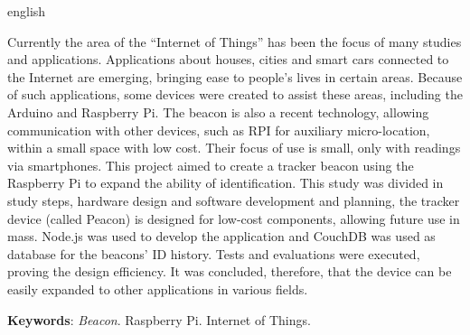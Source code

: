\documentclass[
		12pt,				%
		openright,			%
		oneside,			%
		a4paper,			%
		chapter=TITLE,		%
		english,			%
		brazil				%
	]{abntex2}
\newif\iffinal
\begin{document}
	\begin{resumo}[Abstract]
	 	\begin{otherlanguage*}{english}
			
			Currently the area of ​​the “Internet of Things” has been the focus of many studies and applications. Applications about houses, cities and smart cars connected to the Internet are emerging, bringing ease to people’s lives in certain areas. Because of such applications, some devices were created to assist these areas, including the Arduino and Raspberry Pi. The beacon is also a recent technology, allowing communication with other devices, such as RPI for auxiliary micro-location, within a small space with low cost. Their focus of use is small, only with readings via smartphones. This project aimed to create a tracker beacon using the Raspberry Pi to expand the ability of identification. This study was divided in study steps, hardware design and software development and planning, the tracker device (called Peacon) is designed for low-cost components, allowing future use in mass. Node.js was used to develop the application and CouchDB was used as database for the beacons’ ID history. Tests and evaluations were executed, proving the design efficiency. It was concluded, therefore, that the device can be easily expanded to other applications in various fields.

			\textbf{Keywords}: \textit{Beacon}. Raspberry Pi. Internet of Things.
		\end{otherlanguage*}
	\end{resumo}
	
\fi


\iffinal
	\pdfbookmark[0]{\listfigurename}{lof}
	\listoffigures*
	\cleardoublepage
\fi


\iffinal
	\pdfbookmark[0]{\listtablename}{lot}
	\listoftables*
	\cleardoublepage
\fi
\end{document}
